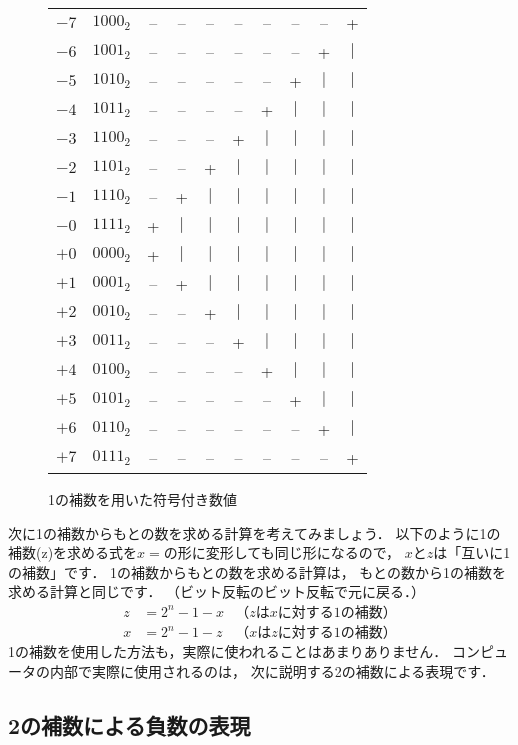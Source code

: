 \newcommand{\h}{$\vert$}
\begin{figure}[tb]
\begin{center}
{\small\begin{tabular}{ r r c c c c c c c c }
$-7$  & $1000_2$ &--&--&--&--&--&--&--& +\\
$-6$  & $1001_2$ &--&--&--&--&--&--&+ &\h\\
$-5$  & $1010_2$ &--&--&--&--&--&+ &\h&\h\\
$-4$  & $1011_2$ &--&--&--&--&+ &\h&\h&\h\\
$-3$  & $1100_2$ &--&--&--&+ &\h&\h&\h&\h\\
$-2$  & $1101_2$ &--&--&+ &\h&\h&\h&\h&\h\\
$-1$  & $1110_2$ &--&+ &\h&\h&\h&\h&\h&\h\\
$-0$  & $1111_2$ &+ &\h&\h&\h&\h&\h&\h&\h\\
$+0$  & $0000_2$ &+ &\h&\h&\h&\h&\h&\h&\h\\
$+1$  & $0001_2$ &--&+ &\h&\h&\h&\h&\h&\h\\
$+2$  & $0010_2$ &--&--&+ &\h&\h&\h&\h&\h\\
$+3$  & $0011_2$ &--&--&--&+ &\h&\h&\h&\h\\
$+4$  & $0100_2$ &--&--&--&--&+ &\h&\h&\h\\
$+5$  & $0101_2$ &--&--&--&--&--&+ &\h&\h\\
$+6$  & $0110_2$ &--&--&--&--&--&--&+ &\h\\
$+7$  & $0111_2$ &--&--&--&--&--&--&--& +\\
\end{tabular}}
\caption{1の補数を用いた符号付き数値}
\label{fig:chap2:1sc}
\end{center}
\end{figure}

次に1の補数からもとの数を求める計算を考えてみましょう．
以下のように1の補数(z)を求める式を$x=$の形に変形しても同じ形になるので，
$x$と$z$は「互いに1の補数」です．
1の補数からもとの数を求める計算は，
もとの数から1の補数を求める計算と同じです．
（ビット反転のビット反転で元に戻る．）
{\small\begin{align*}
z &= 2^n - 1 - x &（zはxに対する1の補数） \\
x &= 2^n - 1 - z &（xはzに対する1の補数）
\end{align*}}
1の補数を使用した方法も，実際に使われることはあまりありません．
コンピュータの内部で実際に使用されるのは，
次に説明する2の補数による表現です．

\subsection{2の補数による負数の表現}\label{chap2:2c}

